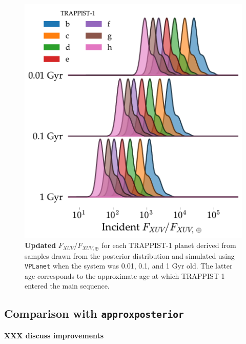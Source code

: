 \documentclass[twocolumn]{aastex62}
\newcommand{\xxx}[1]{{\textbf{#1}}}
\newcommand{\vplanet}[0]{\texttt{VPLanet}\xspace}
\newcommand{\approxposterior}[0]{\texttt{approxposterior}\xspace}
\begin{document}
\begin{figure}
	\includegraphics[width=\columnwidth]{../Analysis/Fluxes/fluxes.pdf}
   \caption{\xxx{Updated} $F_{XUV}/F_{XUV,\oplus}$ for each TRAPPIST-1 planet derived from samples drawn from the posterior distribution and simulated using \vplanet when the system was 0.01, 0.1, and 1 Gyr old. The latter age corresponds to the approximate age at which TRAPPIST-1 entered the main sequence.}%
    \label{fig:fluxes}%
\end{figure}


\subsection{Comparison with \approxposterior} \label{sec:approx}

\xxx{XXX discuss improvements}

\end{document}
